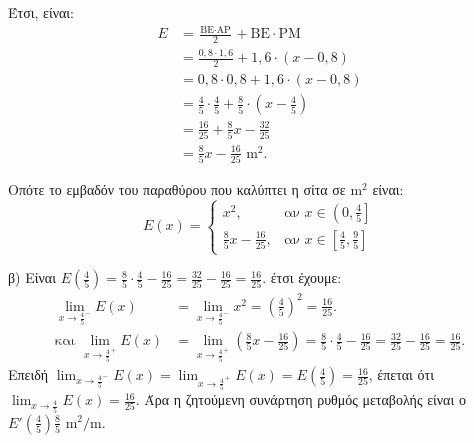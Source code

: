\begin{alist}
\begin{rlist}
\begin{figure}
\end{figure}
Έτσι, είναι:
\begin{align*} E &= \frac{\text{BE} \cdot \text{AP}}{2} + \text{BE} \cdot \text{PM} \\ &= \frac{0,8 \cdot 1,6}{2} + 1,6 \cdot (x-0,8) \\ &= 0,8 \cdot 0,8 + 1,6 \cdot (x-0,8) \\ &= \frac{4}{5} \cdot \frac{4}{5} + \frac{8}{5} \cdot \left(x-\frac{4}{5}\right) \\ &= \frac{16}{25} + \frac{8}{5}x - \frac{32}{25} \\ &= \frac{8}{5}x - \frac{16}{25} \text{ m}^2. \end{align*}
\end{rlist}
Οπότε το εμβαδόν του παραθύρου που καλύπτει η σίτα σε $\text{m}^2$ είναι:
\[ E(x) = \begin{cases} x^2, & \text{αν } x \in \left(0, \frac{4}{5}\right] \\ \frac{8}{5}x - \frac{16}{25}, & \text{αν } x \in \left[\frac{4}{5}, \frac{9}{5}\right] \end{cases} \]

\item β) Είναι $E\left(\frac{4}{5}\right) = \frac{8}{5} \cdot \frac{4}{5} - \frac{16}{25} = \frac{32}{25} - \frac{16}{25} = \frac{16}{25}$.
έτσι έχουμε:
\begin{align*} \lim_{x \to \frac{4}{5}^-} E(x) &= \lim_{x \to \frac{4}{5}^-} x^2 = \left(\frac{4}{5}\right)^2 = \frac{16}{25}. \\ \text{και } \lim_{x \to \frac{4}{5}^+} E(x) &= \lim_{x \to \frac{4}{5}^+} \left(\frac{8}{5}x - \frac{16}{25}\right) = \frac{8}{5} \cdot \frac{4}{5} - \frac{16}{25} = \frac{32}{25} - \frac{16}{25} = \frac{16}{25}. \end{align*}
Επειδή $\lim_{x \to \frac{4}{5}^-} E(x) = \lim_{x \to \frac{4}{5}^+} E(x) = E\left(\frac{4}{5}\right) = \frac{16}{25}$, έπεται ότι $\lim_{x \to \frac{4}{5}} E(x) = \frac{16}{25}$.
Άρα η ζητούμενη συνάρτηση ρυθμός μεταβολής είναι ο $E'\left(\frac{4}{5}\right) \frac{8}{5} \text{ m}^2/\text{m}$.


\end{alist}
